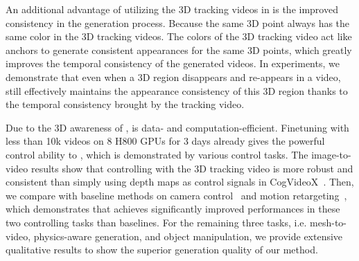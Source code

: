 An additional advantage of utilizing the 3D tracking videos in \methodname is the improved consistency in the generation process. Because the same 3D point always has the same color in the 3D tracking videos. The colors of the 3D tracking video act like anchors to generate consistent appearances for the same 3D points, which greatly improves the temporal consistency of the generated videos. In experiments, we demonstrate that even when a 3D region disappears and re-appears in a video, \methodname still effectively maintains the appearance consistency of this 3D region thanks to the temporal consistency brought by the tracking video.

Due to the 3D awareness of \methodname, \methodname is data- and computation-efficient. Finetuning with less than 10k videos on 8 H800 GPUs for 3 days already gives the powerful control ability to \methodname, which is demonstrated by various control tasks. 
The image-to-video results show that controlling with the 3D tracking video is more robust and consistent than simply using depth maps as control signals in CogVideoX~\cite{yang2024cogvideox}. Then, we compare \methodname with baseline methods on camera control~\cite{wang2024motionctrl,he2024cameractrl} and motion retargeting~\cite{geyer2023tokenflow}, which demonstrates that \methodname achieves significantly improved performances in these two controlling tasks than baselines. For the remaining three tasks, i.e. mesh-to-video, physics-aware generation, and object manipulation, we provide extensive qualitative results to show the superior generation quality of our method.


